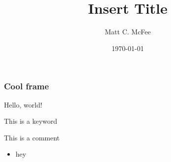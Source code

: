 \documentclass{beamer}
\begin{document}
	
	\title{Insert Title}
	\author{Matt C. McFee}
	\date{\today}
	\maketitle
	
	\begin{frame}
	\frametitle{Cool frame}
	Hello, world!
	
	This is a \textcolor{keywords}{keyword}
	
	This is a \textcolor{comments}{comment}
	
	\begin{itemize}
		\item hey
		\
	\end{itemize}
	\end{frame}
	
\end{document}
